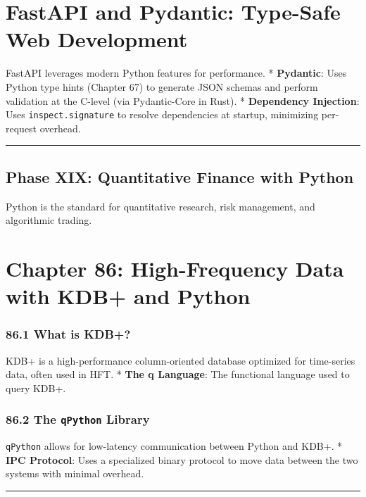 \hypertarget{fastapi-and-pydantic-type-safe-web-development}{%
\chapter{FastAPI and Pydantic: Type-Safe Web
Development}\label{fastapi-and-pydantic-type-safe-web-development}}

FastAPI leverages modern Python features for performance. *
\textbf{Pydantic}: Uses Python type hints (Chapter 67) to generate JSON
schemas and perform validation at the C-level (via Pydantic-Core in
Rust). * \textbf{Dependency Injection}: Uses
\passthrough{\lstinline!inspect.signature!} to resolve dependencies at
startup, minimizing per-request overhead.

\begin{center}\rule{0.5\linewidth}{0.5pt}\end{center}

\hypertarget{phase-xix-quantitative-finance-with-python}{%
\section{Phase XIX: Quantitative Finance with
Python}\label{phase-xix-quantitative-finance-with-python}}

Python is the standard for quantitative research, risk management, and
algorithmic trading.

\hypertarget{chapter-86-high-frequency-data-with-kdb-and-python}{%
\chapter{Chapter 86: High-Frequency Data with KDB+ and
Python}\label{chapter-86-high-frequency-data-with-kdb-and-python}}

\hypertarget{what-is-kdb}{%
\subsection{86.1 What is KDB+?}\label{what-is-kdb}}

KDB+ is a high-performance column-oriented database optimized for
time-series data, often used in HFT. * \textbf{The q Language}: The
functional language used to query KDB+.

\hypertarget{the-qpython-library}{%
\subsection{\texorpdfstring{86.2 The \texttt{qPython}
Library}{86.2 The qPython Library}}\label{the-qpython-library}}

\passthrough{\lstinline!qPython!} allows for low-latency communication
between Python and KDB+. * \textbf{IPC Protocol}: Uses a specialized
binary protocol to move data between the two systems with minimal
overhead.

\begin{center}\rule{0.5\linewidth}{0.5pt}\end{center}
